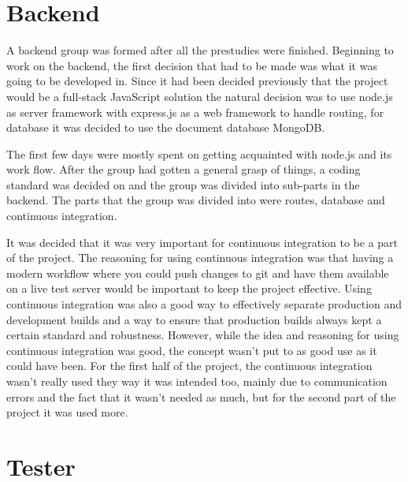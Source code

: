 \section{Backend}
A backend group was formed after all the prestudies were finished.
Beginning to work on the backend, the first decision that had to be made was what it was going to be developed in. Since it had been decided previously that the project would be a full-stack JavaScript solution the natural decision was to use node.js as server framework with express.js as a web framework to handle routing, for database it was decided to use the document database MongoDB.

The first few days were mostly spent on getting acquainted with node.js and its work flow.
After the group had gotten a general grasp of things, a coding standard was decided on and the group was divided into sub-parts in the backend.
The parts that the group was divided into were routes, database and continuous integration.

It was decided that it was very important for continuous integration to be a part of the project. The reasoning for using continuous integration was that having a modern workflow where you could push changes to git and have them available on a live test server would be important to keep the project effective. Using continuous integration was also a good way to effectively separate production and development builds and a way to ensure that production builds always kept a certain standard and robustness.
However, while the idea and reasoning for using continuous integration was good, the concept wasn't put to as good use as it could have been. For the first half of the project, the continuous integration wasn't really used they way it was intended too, mainly due to communication errors and the fact that it wasn't needed as much, but for the second part of the project it was used more.

\section{Tester}

